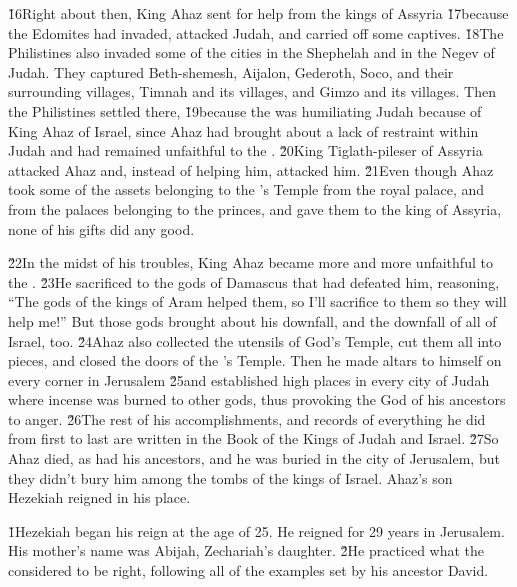 \v{16}Right about then, King Ahaz sent for help from the kings of Assyria \v{17}because the Edomites had invaded, attacked Judah, and carried off some captives. \v{18}The Philistines also invaded some of the cities in the Shephelah and in the Negev of Judah. They captured Beth-shemesh, Aijalon, Gederoth, Soco, and their surrounding villages, Timnah and its villages, and Gimzo and its villages. Then the Philistines settled there, \v{19}because the  was humiliating Judah because of King Ahaz of Israel, since Ahaz had brought about a lack of restraint within Judah and had remained unfaithful to the . \v{20}King Tiglath-pileser of Assyria attacked Ahaz and, instead of helping him, attacked him. \v{21}Even though Ahaz took some of the assets belonging to the 's Temple from the royal palace, and from the palaces belonging to the princes, and gave them to the king of Assyria, none of his gifts did any good.

\v{22}In the midst of his troubles, King Ahaz became more and more unfaithful to the . \v{23}He sacrificed to the gods of Damascus that had defeated him, reasoning, ``The gods of the kings of Aram helped them, so I'll sacrifice to them so they will help me!'' But those gods brought about his downfall, and the downfall of all of Israel, too. \v{24}Ahaz also collected the utensils of God's Temple, cut them all into pieces, and closed the doors of the 's Temple. Then he made altars to himself on every corner in Jerusalem \v{25}and established high places in every city of Judah where incense was burned to other gods, thus provoking the  God of his ancestors to anger. \v{26}The rest of his accomplishments, and records of everything he did from first to last are written in the Book of the Kings of Judah and Israel. \v{27}So Ahaz died, as had his ancestors, and he was buried in the city of Jerusalem, but they didn't bury him among the tombs of the kings of Israel. Ahaz's son Hezekiah reigned in his place.

\v{1}Hezekiah began his reign at the age of 25. He reigned for 29 years in Jerusalem. His mother's name was Abijah, Zechariah's daughter. \v{2}He practiced what the  considered to be right, following all of the examples set by his ancestor David.

